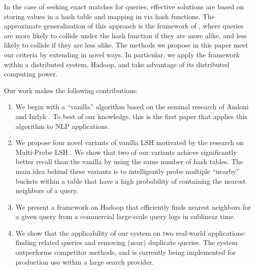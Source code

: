 In the case of seeking exact matches for queries, effective solutions
are based on storing values in a hash table and mapping in via hash
functions. 
The approximate generalization of this approach is the framework of
\lshf, where queries are more likely to collide
under the hash function if they are more alike, and less likely to collide
if they are less alike. 
The methods we propose in this paper meet our criteria by extending \lshf 
\cite{Indyk98STOC,Charikar02STOC,Andoni06FOCS,Andoni08CACM}  in novel ways. 
In particular, we apply the framework within a distributed 
system, Hadoop, and take advantage of its distributed computing power.

Our work makes the following contributions: 
\begin{enumerate}
\item We begin with a ``vanilla'' \lsh algorithm based on the seminal
  research of Andoni and Indyk  .
 To best of our knowledge, this is the first paper that applies this algorithm to NLP applications. 
\item We propose four novel variants of vanilla LSH motivated by the
  research on Multi-Probe LSH \cite{LvVLDB07}.  We show that two of
  our variants achieve significantly better recall than the vanilla
  \lsh by using the same number of hash tables. The main idea behind
  these variants is to intelligently probe multiple ``nearby'' buckets within a table that have a high probability of containing the nearest neighbors of a query.  
\item We present a framework on Hadoop that efficiently finds nearest neighbors for a given query from a commercial large-scale query logs in sublinear time. %
\item  We show that the applicability of our system on two real-world
  applications: finding related queries and removing (near) duplicate
  queries.
The system outperforms competitor methods, and is currently being
implemented for production use within a large search provider. 
\end{enumerate}


